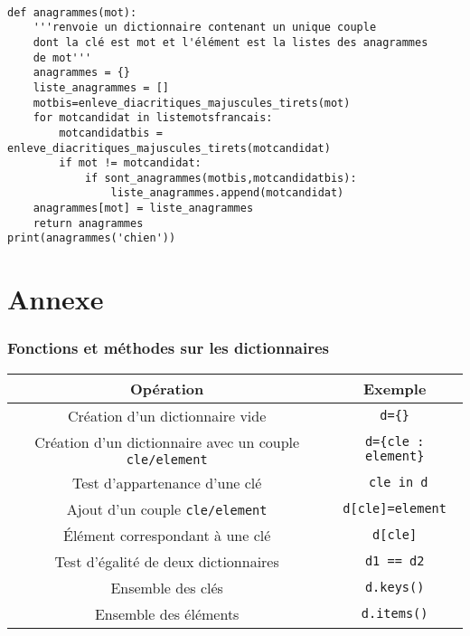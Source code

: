 \begin{solution}~\
\begin{verbatim}
def anagrammes(mot):
    '''renvoie un dictionnaire contenant un unique couple
    dont la clé est mot et l'élément est la listes des anagrammes
    de mot'''
    anagrammes = {}
    liste_anagrammes = []
    motbis=enleve_diacritiques_majuscules_tirets(mot)
    for motcandidat in listemotsfrancais:
        motcandidatbis = enleve_diacritiques_majuscules_tirets(motcandidat)
        if mot != motcandidat:
            if sont_anagrammes(motbis,motcandidatbis):
                liste_anagrammes.append(motcandidat)
    anagrammes[mot] = liste_anagrammes
    return anagrammes
print(anagrammes('chien'))
\end{verbatim}
\end{solution}

%
%

\section*{Annexe}

\subsubsection*{Fonctions et méthodes sur les dictionnaires}

\begin{tabular}{|c|c|}
  \hline
  Opération & Exemple  \\
  \hline
  \hline
  Création d'un dictionnaire vide & \verb+d={}+ \\
  \hline
  Création d'un dictionnaire avec un couple \texttt{cle/element}& \verb+d={cle : element}+ \\
  \hline
  Test d'appartenance d'une clé & \verb+ cle in d+ \\
  \hline
  Ajout d'un couple \texttt{cle/element} & \verb+d[cle]=element+ \\
  \hline
  Élément correspondant à une clé & \verb+d[cle]+ \\
  \hline
  Test d'égalité de deux dictionnaires & \verb+d1 == d2+\\
  \hline
  Ensemble des clés & \verb-d.keys()- \\
  \hline
  Ensemble des éléments  & \verb+d.items()+\\
  \hline
\end{tabular}


